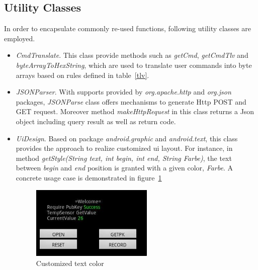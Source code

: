\subsection{Utility Classes}
In order to encapsulate commonly re-used functions, following utility classes are employed.
\begin{itemize}
\item \emph{CmdTranslate}. This class provide methods such as \emph{getCmd}, \emph{getCmdTlv} and \emph{byteArrayToHexString}, which are used to translate user commands into byte arrays based on rules defined in table~\ref{tlv}.
\item \emph{JSONParser}. With supports provided by \emph{org.apache.http} and \emph{org.json} packages, \emph{JSONParse} class offers mechanisms to generate Http POST and GET request. Moreover method \emph{makeHttpRequest} in this class returns a Json object including query result as well as return code.
\item \emph{UiDesign}. Based on package \emph{android.graphic} and \emph{android.text}, this class provides the approach to realize customized ui layout. For instance, in method \emph{getStyle(String text, int begin, int end, String Farbe)}, the text between \emph{begin} and \emph{end} position is granted with a given color,  \emph{Farbe}. A concrete usage case is demonstrated in figure~\ref{fig:get-style}

\begin{figure}[!htbp]
	\centering
	\includegraphics[width=0.55\textwidth]{get-style.jpg}
		\caption{Customized text color}
	\label{fig:get-style}
\end{figure}

\end{itemize} 
